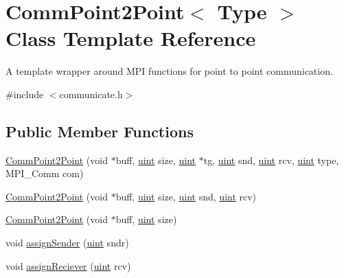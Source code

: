 \hypertarget{classCommPoint2Point}{}\section{Comm\+Point2\+Point$<$ Type $>$ Class Template Reference}
\label{classCommPoint2Point}


A template wrapper around M\+PI functions for point to point communication.  




{\ttfamily \#include $<$communicate.\+h$>$}

\subsection*{Public Member Functions}
\begin{DoxyCompactItemize}
\item 
\mbox{\hyperlink{classCommPoint2Point_aa23f80d9c92ccc7d1ce601ec829c6ff7}{Comm\+Point2\+Point}} (void $\ast$buff, \mbox{\hyperlink{definitions_8h_a69aa29b598b851b0640aa225a9e5d61d}{uint}} size, \mbox{\hyperlink{definitions_8h_a69aa29b598b851b0640aa225a9e5d61d}{uint}} $\ast$tg, \mbox{\hyperlink{definitions_8h_a69aa29b598b851b0640aa225a9e5d61d}{uint}} snd, \mbox{\hyperlink{definitions_8h_a69aa29b598b851b0640aa225a9e5d61d}{uint}} rcv, \mbox{\hyperlink{definitions_8h_a69aa29b598b851b0640aa225a9e5d61d}{uint}} type, M\+P\+I\+\_\+\+Comm com)
\item 
\mbox{\hyperlink{classCommPoint2Point_a2d595c46eb1c130069ad90c9782cf63e}{Comm\+Point2\+Point}} (void $\ast$buff, \mbox{\hyperlink{definitions_8h_a69aa29b598b851b0640aa225a9e5d61d}{uint}} size, \mbox{\hyperlink{definitions_8h_a69aa29b598b851b0640aa225a9e5d61d}{uint}} snd, \mbox{\hyperlink{definitions_8h_a69aa29b598b851b0640aa225a9e5d61d}{uint}} rcv)
\item 
\mbox{\hyperlink{classCommPoint2Point_a7e60b9a67fcae40edaa4410425fac6ab}{Comm\+Point2\+Point}} (void $\ast$buff, \mbox{\hyperlink{definitions_8h_a69aa29b598b851b0640aa225a9e5d61d}{uint}} size)
\item 
void \mbox{\hyperlink{classCommPoint2Point_a26bf177b75a31154c5d008b0ac7364f0}{assign\+Sender}} (\mbox{\hyperlink{definitions_8h_a69aa29b598b851b0640aa225a9e5d61d}{uint}} sndr)
\item 
void \mbox{\hyperlink{classCommPoint2Point_a0b5ed7ad903ab51aa0429e54bcf6d58e}{assign\+Reciever}} (\mbox{\hyperlink{definitions_8h_a69aa29b598b851b0640aa225a9e5d61d}{uint}} rcv)
\item 

\end{DoxyCompactItemize}
